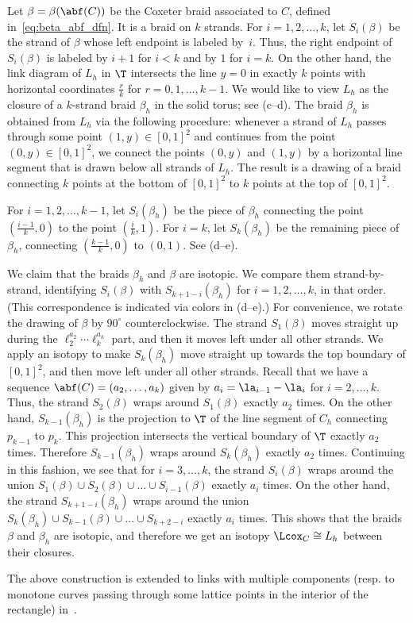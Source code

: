 Let $\beta=\beta(\abf(C))$ be the Coxeter braid associated to $C$, defined in~\eqref{eq:beta_abf_dfn}. It is a braid on $k$ strands. For $i=1,2,\dots,k$, let $S_i(\beta)$ be the strand of $\beta$ whose left endpoint is labeled by~$i$. Thus, the right endpoint of $S_i(\beta)$ is labeled by $i+1$ for $i<k$ and by $1$ for $i=k$. On the other hand, the link diagram of $L_h$ in $\T$ intersects the line $y=0$ in exactly $k$ points with horizontal coordinates $\frac rk$ for $r=0,1,\dots, k-1$. We would like to view $L_h$ as the closure of a $k$-strand braid $\beta_h$ in the solid torus; see (c--d). The braid $\beta_h$ is obtained from $L_h$ via the following procedure: whenever a strand of $L_h$ passes through some point $(1,y)\in[0,1]^2$ and continues from the point $(0,y)\in[0,1]^2$, we connect the points $(0,y)$ and $(1,y)$ by a horizontal line segment that is drawn below all strands of $L_h$. The result is a drawing of a braid connecting $k$ points at the bottom of $[0,1]^2$ to $k$ points at the top of $[0,1]^2$. 

For $i=1,2,\dots, k-1$, let $S_i(\beta_h)$ be the piece of $\beta_h$ connecting the point $(\frac{i-1}k,0)$ to the point $(\frac ik,1)$. For $i=k$, let $S_k(\beta_h)$ be the remaining piece of $\beta_h$, connecting $(\frac{k-1}k,0)$ to $(0,1)$. See (d--e).

We claim that the braids $\beta_h$ and $\beta$ are isotopic. We compare them strand-by-strand, identifying $S_i(\beta)$ with $S_{k+1-i}(\beta_h)$ for $i=1,2,\dots,k$, in that order. (This correspondence is indicated via colors in (d--e).) For convenience, we rotate the drawing of $\beta$ by $90^\circ$ counterclockwise. The strand $S_1(\beta)$ moves straight up during the $\ell_2^{a_2}\cdots \ell_k^{a_k}$ part, and then it moves left under all other strands. We apply an isotopy to make $S_k(\beta_h)$ move straight up towards the top boundary of $[0,1]^2$, and then move left under all other strands. Recall that we have a sequence $\abf(C)=(a_2,\dots,a_k)$ given by $a_i=\la_{i-1}-\la_i$ for $i=2,\dots,k$. Thus, the strand $S_2(\beta)$ wraps around $S_1(\beta)$ exactly $a_2$ times. On the other hand, $S_{k-1}(\beta_h)$ is the projection to $\T$ of the line segment of $C_h$ connecting $p_{k-1}$ to $p_k$. This projection intersects the vertical boundary of $\T$ exactly $a_2$ times. Therefore $S_{k-1}(\beta_h)$ wraps around $S_k(\beta_h)$ exactly $a_2$ times. Continuing in this fashion, we see that for $i=3,\dots,k$, the strand $S_i(\beta)$ wraps around the union $S_1(\beta)\cup S_2(\beta)\cup\dots\cup S_{i-1}(\beta)$ exactly $a_i$ times. On the other hand, the strand $S_{k+1-i}(\beta_h)$ wraps around the union $S_k(\beta_h)\cup S_{k-1}(\beta)\cup\dots\cup S_{k+2-i}$ exactly $a_i$ times. This shows that the braids $\beta$ and $\beta_h$ are isotopic, and therefore we get an isotopy $\Lcox_C\cong L_h$ between their closures.

\begin{remark}
The above construction is extended to links with multiple components (resp. to monotone curves passing through some lattice points in the interior of the rectangle) in~\cite[Section~7.3]{GL_EHA}.
\end{remark} 


